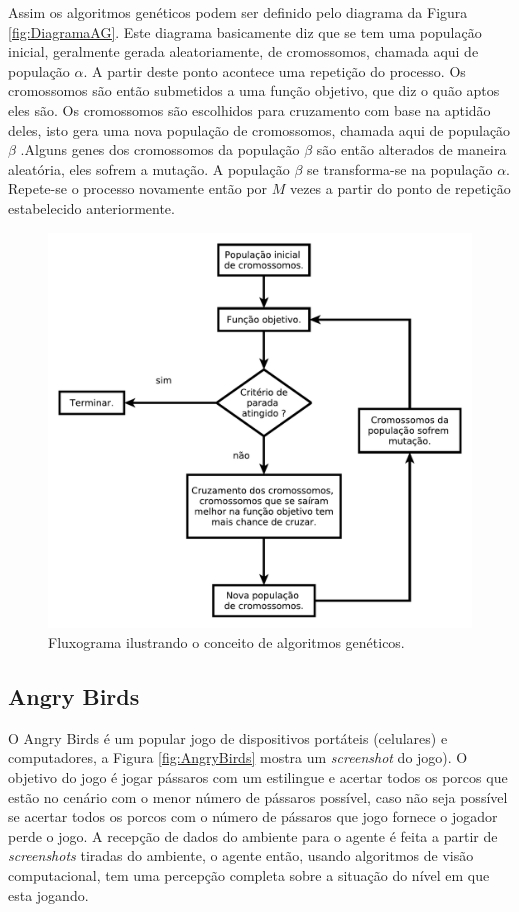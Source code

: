 \documentclass[10pt,a4paper]{article}
\begin{document}
Assim os algoritmos genéticos podem ser definido pelo diagrama da Figura \ref{fig:DiagramaAG}. Este diagrama basicamente diz que se tem uma população inicial, geralmente gerada aleatoriamente, de cromossomos, chamada aqui de população $\alpha$. A partir deste ponto acontece uma repetição do processo. Os cromossomos são então submetidos a uma função objetivo, que diz o quão aptos eles são. Os cromossomos são escolhidos para cruzamento com base na aptidão deles, isto gera uma nova população de cromossomos, chamada aqui de população $\beta$ .Alguns genes dos cromossomos da população $\beta$ são então alterados de maneira aleatória, eles sofrem a mutação. A população $\beta$ se transforma-se na população $\alpha$. Repete-se o processo novamente então por $M$ vezes a partir do ponto de repetição estabelecido anteriormente.
\begin{figure}[H]
  \center
  \includegraphics[scale=0.6]{imgs/diagramaAG.pdf}            
  \caption{Fluxograma ilustrando o conceito de algoritmos genéticos.}
  \label{fig:MostrandoOCruzamentoUniforme}
\end{figure}

\subsection{Angry Birds}
\label{sec:angryBirds}
O Angry Birds é um popular jogo de dispositivos portáteis (celulares) e computadores, a Figura \ref{fig:AngryBirds} mostra um \emph{screenshot} do jogo). O objetivo do jogo é jogar pássaros com um estilingue e acertar todos os porcos que estão no cenário com o menor número de pássaros possível, caso não seja possível se acertar todos os porcos com o número de pássaros que jogo fornece o jogador perde o jogo. A recepção de dados do ambiente para o agente é feita a partir de \emph{screenshots} tiradas do ambiente, o agente então, usando algoritmos de visão computacional, tem uma percepção completa sobre a situação do nível em que esta jogando.  
\end{document}
